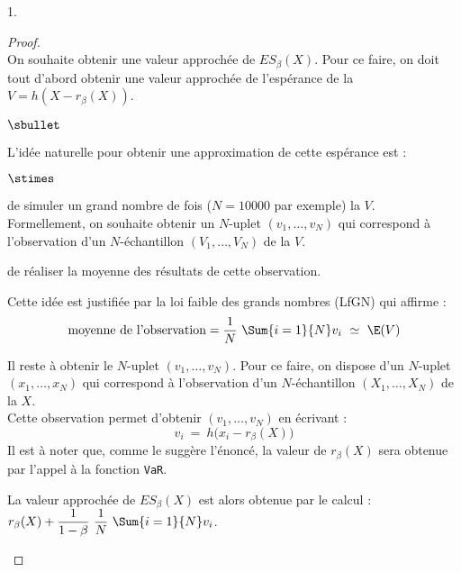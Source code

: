 \documentclass[11pt]{article}%
\begin{document}
\begin{noliste}{1.}
  \begin{proof}~\\%
    On souhaite obtenir une valeur approchée de $ES_{\beta}(X)$. Pour
    ce faire, on doit tout d'abord obtenir une valeur approchée de
    l'espérance de la \var $V = h(X- r_\beta(X))$.
    \begin{noliste}{$\sbullet$}
    \item L'idée naturelle pour obtenir une approximation de cette
      espérance est :
      \begin{noliste}{$\stimes$}
      \item de simuler un grand nombre de fois ($N = 10000$ par
        exemple) la \var $V$.\\
        Formellement, on souhaite obtenir un $N$-uplet $(v_1,
        \ldots, v_N)$ qui correspond à l'observation d'un
        $N$-échantillon $(V_1, \ldots, V_N)$ de la \var $V$.
      \item de réaliser la moyenne des résultats de cette
        observation.
      \end{noliste}
      Cette idée est justifiée par la loi faible des grands nombres
      (LfGN) qui affirme :
      \[
      \mbox{moyenne de l'observation} = \dfrac{1}{N} \ \Sum{i =
        1}{N} v_i \ \simeq \ \E(V)
      \]

    \item Il reste à obtenir le $N$-uplet $(v_1, \ldots, v_N)$. Pour
      ce faire, on dispose d'un $N$-uplet $(x_1, \ldots, x_N)$ qui
      correspond à l'observation d'un $N$-échantillon $(X_1, \ldots,
      X_N)$ de la \var $X$.\\
      Cette observation permet d'obtenir $(v_1, \hdots, v_N)$ en 
      écrivant :
      \[
      v_i \ = \ h\big(x_i - r_{\beta}(X)\big)
      \]
      Il est à noter que, comme le suggère l'énoncé, la valeur de
      $r_{\beta}(X)$ sera obtenue par l'appel à la fonction {\tt VaR}.

    \item La valeur approchée de $ES_{\beta}(X)$ est alors obtenue par
      le calcul : $r_{\beta}(X) + \dfrac{1}{1-\beta} \ \dfrac{1}{N} \
      \Sum{i = 1}{N} v_i$.


\end{noliste}
\end{proof}
\end{noliste}
\end{document}
